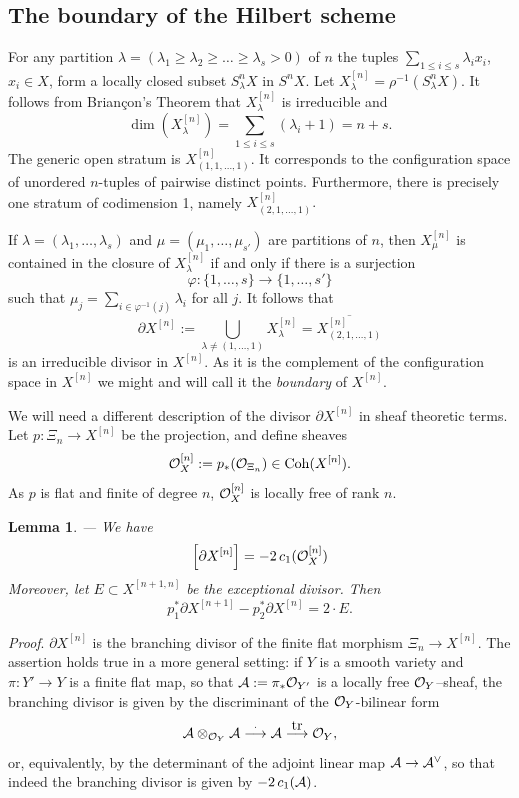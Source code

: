 \documentclass[twoside,11pt]{article}
\newtheorem{lemma}[theorem]{Lemma}
\newcommand{\prf}{{\kursiv Proof}. }
\newcommand{\kursiv}{\sl}
\newcommand{\ka}{{\cal A}}
\newcommand{\ko}{{\cal O}}
\newcommand{\dual}{\makebox[0mm]{}^{{\scriptstyle\vee}}}
\newcommand{\tensor}{\otimes}
\renewcommand{\phi}{\varphi}
\newcommand{\Coh}{{\rm Coh}}
\newcommand{\lra}{\longrightarrow}
\begin{document}
\subsection{The boundary of the Hilbert scheme}\label{TheBoundary}

For any partition $\lambda=(\lambda_1\geq\lambda_2\geq\ldots\geq\lambda_s>0)$
of $n$ the tuples $\sum_{1\leq i\leq s}\lambda_ix_i$, $x_i\in X$, form
a locally closed subset $S^n_\lambda X$ in $S^nX$. Let
$X^{[n]}_\lambda=\rho^{-1}(S^n_\lambda X)$. It follows from Brian\c{c}on's
Theorem that $X^{[n]}_\lambda$ is irreducible and
$$\dim(X^{[n]}_{\lambda})=\sum_{1\leq i\leq s}(\lambda_i+1)=n+s.$$
The generic open stratum is 
$X^{[n]}_{(1,1,\ldots,1)}$. It corresponds to the configuration space of 
unordered $n$-tuples of pairwise distinct points. Furthermore, there is 
precisely one stratum of codimension 1, namely $X^{[n]}_{(2,1,\ldots,1)}.$

If $\lambda=(\lambda_1,\ldots,\lambda_s)$ and $\mu=(\mu_1,\ldots,\mu_{s'})$
are partitions of $n$, then $X^{[n]}_\mu$ is contained in the closure of $X^{[n]}_\lambda$ if and only if there is a surjection
$$\phi:\{1,\ldots,s\}\to \{1,\ldots,s'\}$$
such that $\mu_j=\sum_{i\in\phi^{-1}(j)}\lambda_i$ for all $j$.
It follows that
$$\partial X^{[n]}:=\bigcup_{\lambda\neq(1,\ldots,1)}X^{[n]}_\lambda=
\overline{X^{[n]}_{(2,1,\ldots,1)}}$$
is an irreducible divisor in $X^{[n]}$. As it is the complement of the configuration space in $X^{[n]}$ we might and will call it the {\em boundary}
of $X^{[n]}$.

We will need a different description of the divisor $\partial X^{[n]}$
in sheaf theoretic terms.
Let $p:\Xi_n\to X^{[n]}$ be the projection, and define sheaves
$$\ko_X^{[n]}:=p_*(\ko_{\Xi_n})\in \Coh(X^{[n]}).$$
As $p$ is flat and finite of degree $n$, $\ko_X^{[n]}$ is locally free of rank
$n$.  

\begin{lemma}\label{DnX}\label{boundarydescription}--- We have
$$\left[\partial X^{[n]}\right]=-2\,c_1(\ko_X^{[n]})$$ 
Moreover, let $E\subset X^{[n+1,n]}$ be the exceptional divisor. Then
$$p_1^*\partial X^{[n+1]}-p_2^*\partial X^{[n]}=2\cdot E.$$
\end{lemma}

\prf $\partial X^{[n]}$ is the branching divisor of the finite flat
morphism $\Xi_n\to X^{[n]}$. The assertion holds true in a more general setting: if $Y$ is a smooth variety and
$\pi:Y'\to Y$ is a finite flat map, so that $\ka:=\pi_*\ko_{Y'}$ is a locally
free $\ko_Y$--sheaf, the branching divisor is given by the discriminant of
the $\ko_Y$-bilinear form
$$\ka\tensor_{\ko_Y}\ka\stackrel{\cdot}\lra\ka\stackrel{\mbox{tr}}\lra\ko_Y,$$
or, equivalently, by the determinant of the adjoint linear map $\ka\to 
\ka\dual$, so that indeed the branching divisor is given by $-2\,c_1(\ka)$. 
\end{document}
